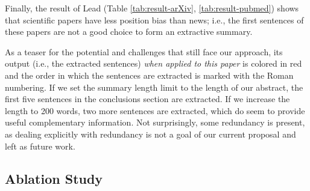 Finally, the result of Lead (Table \ref{tab:result-arXiv}, \ref{tab:result-pubmed}) shows that scientific papers have less position bias than news; i.e., the first  sentences of these papers are not a good choice to form an extractive summary. 

As a teaser for the potential and challenges that still face our approach, its output (i.e., the extracted sentences) {\it when applied to this paper} is colored in red and the order in which the sentences are extracted is marked with the Roman numbering. If we set the summary length limit to the length of our abstract, the first five sentences in the conclusions section are extracted. If we increase the length to 200 words, two more sentences are extracted, which do seem to provide useful complementary information. Not surprisingly, some redundancy is present, as dealing explicitly with redundancy is not a goal of our current proposal and left as future work.
\subsection{Ablation Study}

